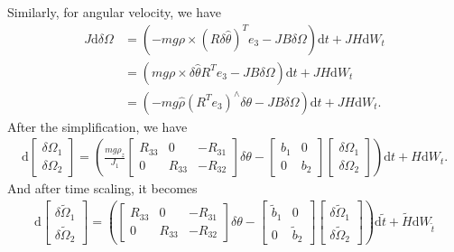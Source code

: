 \documentclass[10pt]{article}
\newcommand{\diff}[1]{\mathrm{d}#1}
\begin{document}
Similarly, for angular velocity, we have
\begin{align*}
	J\diff{\delta\Omega} &= \left( -mg\rho\times \left( R\delta\hat{\theta} \right)^Te_3 - JB\delta\Omega \right) \diff{t} + JH\diff{W_t} \\
	&= \left( mg\rho\times \delta\hat{\theta}R^Te_3 - JB\delta\Omega \right) \diff{t} + JH\diff{W_t} \\
	&= \left( -mg \hat{\rho} \left(R^Te_3\right)^\wedge \delta\theta - JB\delta\Omega \right) \diff{t} + JH\diff{W_t}.
\end{align*}
After the simplification, we have
\begin{align*}
	\diff \begin{bmatrix} \delta\Omega_1 \\ \delta\Omega_2 \end{bmatrix} = \left( \frac{mg\rho_z}{J_1} \begin{bmatrix} R_{33} & 0 & -R_{31} \\ 0 & R_{33} & -R_{32} \end{bmatrix} \delta\theta - \begin{bmatrix} b_1 & 0 \\ 0 & b_2 \end{bmatrix} \begin{bmatrix} \delta\Omega_1 \\ \delta\Omega_2 \end{bmatrix} \right) \diff{t} + H\diff{W_t}.
\end{align*}
And after time scaling, it becomes
\begin{align}
	\diff \begin{bmatrix} \delta\tilde{\Omega}_1 \\ \delta\tilde{\Omega}_2 \end{bmatrix} = \left( \begin{bmatrix} R_{33} & 0 & -R_{31} \\ 0 & R_{33} & -R_{32} \end{bmatrix} \delta\theta - \begin{bmatrix} \tilde{b}_1 & 0 \\ 0 & \tilde{b}_2 \end{bmatrix} \begin{bmatrix} \delta\tilde{\Omega}_1 \\ \delta\tilde{\Omega}_2 \end{bmatrix} \right) \diff{\tilde{t}} + \tilde{H} \diff{W_{\tilde{t}}}
\end{align}
\end{document}
